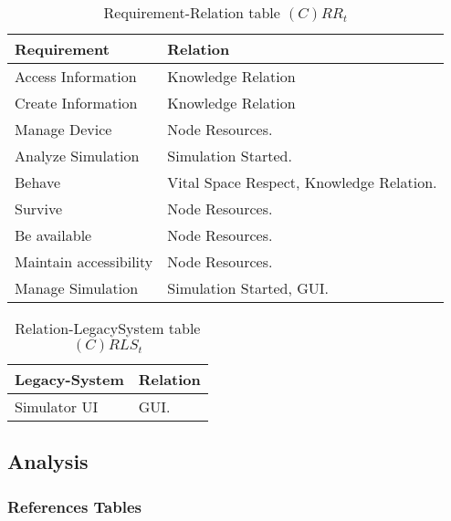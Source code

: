 \begin{table}[H]
	\centering
	\begin{tabular}{|p{4cm}|p{8cm}|}
			\hline
			\textbf{Requirement} & \textbf{Relation} \\
			\hline
			Access Information & Knowledge Relation  \\
			\hline
			Create Information & Knowledge Relation  \\
			\hline
			Manage Device & Node Resources.  \\
			\hline
			Analyze Simulation & Simulation Started. \\
			\hline
			Behave & Vital Space Respect, Knowledge Relation. \\
			\hline
			Survive & Node Resources. \\
			\hline
			Be available & Node Resources. \\
			\hline
			Maintain accessibility & Node Resources. \\
			\hline
			Manage Simulation & Simulation Started, GUI. \\
			\hline
		\end{tabular}
	\caption{Requirement-Relation table $(C)RR_t$}
	\label{tab:crrt}
\end{table}

\begin{table}[H]
	\centering
	\begin{tabular}{|p{4cm}|p{8cm}|}
			\hline
			\textbf{Legacy-System} & \textbf{Relation} \\
			\hline
			Simulator UI & GUI. \\
			\hline
		\end{tabular}
	\caption{Relation-LegacySystem table $(C)RLS_t$}
	\label{tab:crlst}
\end{table}

\subsection{Analysis}

\subsubsection{References Tables}

